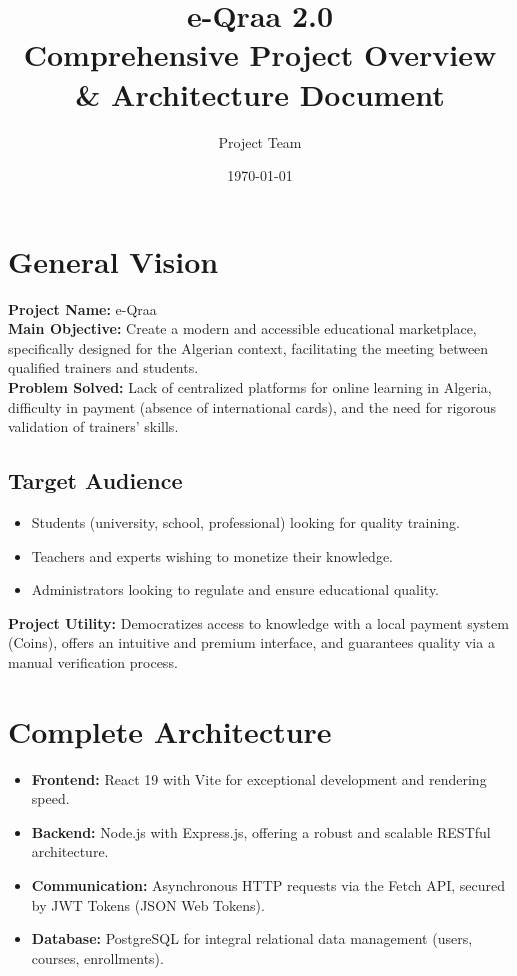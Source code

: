 \documentclass[12pt,a4paper]{article}
\title{\textbf{e-Qraa 2.0}\\ \large Comprehensive Project Overview \& Architecture Document}
\author{Project Team}
\date{\today}
\begin{document}
\maketitle
\tableofcontents
\newpage

\section{General Vision}
\textbf{Project Name:} e-Qraa  \\
\textbf{Main Objective:} Create a modern and accessible educational marketplace, specifically designed for the Algerian context, facilitating the meeting between qualified trainers and students.  \\
\textbf{Problem Solved:} Lack of centralized platforms for online learning in Algeria, difficulty in payment (absence of international cards), and the need for rigorous validation of trainers' skills.

\subsection{Target Audience}
\begin{itemize}[noitemsep]
    \item Students (university, school, professional) looking for quality training.
    \item Teachers and experts wishing to monetize their knowledge.
    \item Administrators looking to regulate and ensure educational quality.
\end{itemize}

\textbf{Project Utility:} Democratizes access to knowledge with a local payment system (Coins), offers an intuitive and premium interface, and guarantees quality via a manual verification process.

\section{Complete Architecture}
\begin{itemize}[noitemsep]
    \item \textbf{Frontend:} React 19 with Vite for exceptional development and rendering speed.
    \item \textbf{Backend:} Node.js with Express.js, offering a robust and scalable RESTful architecture.
    \item \textbf{Communication:} Asynchronous HTTP requests via the Fetch API, secured by JWT Tokens (JSON Web Tokens).
    \item \textbf{Database:} PostgreSQL for integral relational data management (users, courses, enrollments).
\end{itemize}
\end{document}
